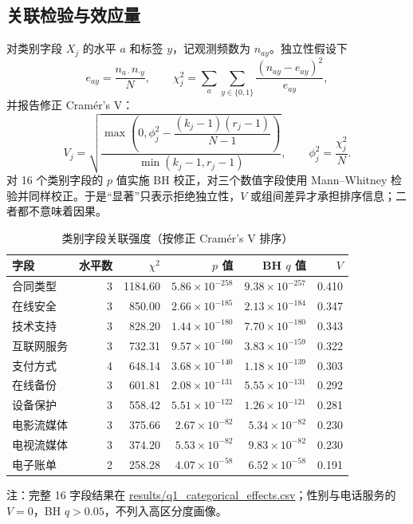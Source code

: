\documentclass[UTF8,a4paper,11pt]{ctexart}
\newcommand{\code}[1]{\url{#1}}
\begin{document}
\subsection{关联检验与效应量}
对类别字段 \(X_j\) 的水平 \(a\) 和标签 \(y\)，记观测频数为 \(n_{ay}\)。独立性假设下
\begin{equation}
e_{ay}=\frac{n_{a\cdot}n_{\cdot y}}{N},\qquad
\chi_j^2=\sum_a\sum_{y\in\{0,1\}}\frac{(n_{ay}-e_{ay})^2}{e_{ay}},
\label{eq:chi-v2}
\end{equation}
并报告修正 Cramér's V：
\begin{equation}
V_j=\sqrt{\frac{\max\left(0,\phi_j^2-\dfrac{(k_j-1)(r_j-1)}{N-1}\right)}{\min(k_j-1,r_j-1)}},
\qquad \phi_j^2=\frac{\chi_j^2}{N}.
\label{eq:cramer-v2}
\end{equation}
对 16 个类别字段的 \(p\) 值实施 BH 校正，对三个数值字段使用 Mann--Whitney 检验并同样校正。于是“显著”只表示拒绝独立性，\(V\) 或组间差异才承担排序信息；二者都不意味着因果。

\begin{table}[H]
\centering
\caption{类别字段关联强度（按修正 Cramér's V 排序）}
\label{tab:q1-cat-v2}
\scriptsize
\begin{tabular}{@{}lrrrrr@{}}
\toprule
字段&水平数&\(\chi^2\)&\(p\) 值&BH \(q\) 值&\(V\)\\
\midrule
合同类型&3&1184.60&\(5.86\times10^{-258}\)&\(9.38\times10^{-257}\)&0.410\\
在线安全&3&850.00&\(2.66\times10^{-185}\)&\(2.13\times10^{-184}\)&0.347\\
技术支持&3&828.20&\(1.44\times10^{-180}\)&\(7.70\times10^{-180}\)&0.343\\
互联网服务&3&732.31&\(9.57\times10^{-160}\)&\(3.83\times10^{-159}\)&0.322\\
支付方式&4&648.14&\(3.68\times10^{-140}\)&\(1.18\times10^{-139}\)&0.303\\
在线备份&3&601.81&\(2.08\times10^{-131}\)&\(5.55\times10^{-131}\)&0.292\\
设备保护&3&558.42&\(5.51\times10^{-122}\)&\(1.26\times10^{-121}\)&0.281\\
电影流媒体&3&375.66&\(2.67\times10^{-82}\)&\(5.34\times10^{-82}\)&0.230\\
电视流媒体&3&374.20&\(5.53\times10^{-82}\)&\(9.83\times10^{-82}\)&0.230\\
电子账单&2&258.28&\(4.07\times10^{-58}\)&\(6.52\times10^{-58}\)&0.191\\
\bottomrule
\end{tabular}
\begin{tablenotes}
\footnotesize\item 注：完整 16 字段结果在 \code{results/q1_categorical_effects.csv}；性别与电话服务的 \(V=0\)，BH \(q>0.05\)，不列入高区分度画像。
\end{tablenotes}
\end{table}
\end{document}
